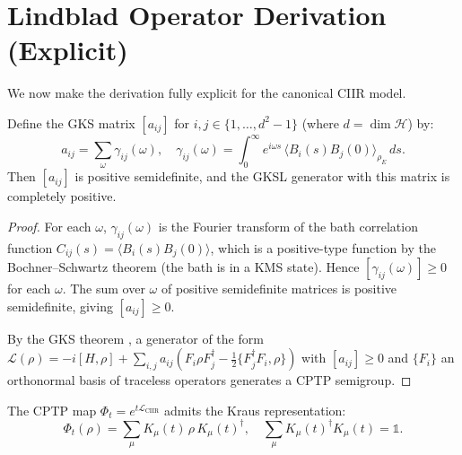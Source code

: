 \section{Lindblad Operator Derivation (Explicit)}
\label{sec:c9:lindblad}

We now make the derivation fully explicit for the canonical CIIR model.

\begin{theorem}
\label{thm:c9:gks}
Define the GKS matrix $[a_{ij}]$ for $i, j \in \{1, \ldots, d^2-1\}$
(where $d = \dim\mathcal{H}$) by:
\begin{equation}
  a_{ij} = \sum_\omega \gamma_{ij}(\omega),
  \quad
  \gamma_{ij}(\omega) =
    \int_0^\infty e^{i\omega s}\,
    \langle B_i(s) B_j(0) \rangle_{\rho_E}\, ds.
  \label{eq:c9:gks}
\end{equation}
Then $[a_{ij}]$ is positive semidefinite, and the GKSL generator with
this matrix is completely positive.
\end{theorem}

\begin{proof}
For each $\omega$, $\gamma_{ij}(\omega)$ is the Fourier transform of the
bath correlation function $C_{ij}(s) = \langle B_i(s) B_j(0) \rangle$,
which is a positive-type function by the Bochner--Schwartz theorem (the
bath is in a KMS state).  Hence $[\gamma_{ij}(\omega)] \geq 0$ for each
$\omega$.  The sum over $\omega$ of positive semidefinite matrices is
positive semidefinite, giving $[a_{ij}] \geq 0$.

By the GKS theorem \cite{GKS1976}, a generator of the form
$\mathcal{L}(\rho) = -i[H,\rho] + \sum_{i,j} a_{ij}
(F_i \rho F_j^\dagger - \tfrac{1}{2}\{F_j^\dagger F_i, \rho\})$
with $[a_{ij}] \geq 0$ and $\{F_i\}$ an orthonormal basis of
traceless operators generates a CPTP semigroup.
\end{proof}

\begin{proposition}
\label{prop:c9:kraus}
The CPTP map $\Phi_t = e^{t\mathcal{L}_{\mathrm{CIIR}}}$ admits the
Kraus representation:
\begin{equation}
  \Phi_t(\rho) = \sum_\mu K_\mu(t)\, \rho\, K_\mu(t)^\dagger,
  \quad
  \sum_\mu K_\mu(t)^\dagger K_\mu(t) = \mathbb{1}.
  \label{eq:c9:kraus}
\end{equation}
\end{proposition}

